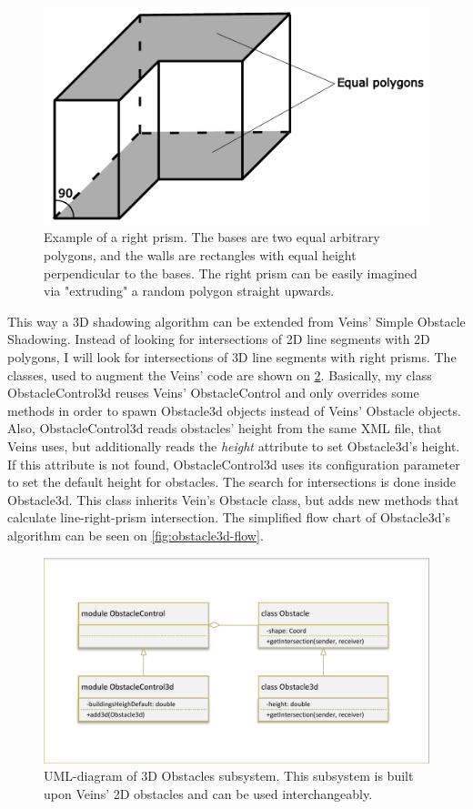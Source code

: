 \documentclass[]{nsm-thesis}
\begin{document}
\begin{figure}
	\centering
	\includegraphics[width=1\textwidth]{figures/RightPrism.pdf}
	\caption{Example of a right prism. The bases are two equal arbitrary polygons, and the walls are rectangles with equal height perpendicular to the bases. The right prism can be easily imagined via "extruding" a random polygon straight upwards.}
	\label{fig:rightprism}
\end{figure}

This way a 3D shadowing algorithm can be extended from Veins' Simple Obstacle Shadowing. Instead of looking for intersections of 2D line segments with 2D polygons, I will look for intersections of 3D line segments with right prisms. The classes, used to augment the Veins' code are shown on \cref{fig:obstacle3d-classes}.  Basically, my class ObstacleControl3d reuses Veins' ObstacleControl and only overrides some methods in order to spawn Obstacle3d objects instead of Veins' Obstacle objects. Also, ObstacleControl3d reads obstacles' height from the same XML file, that Veins uses, but additionally reads the \emph{height} attribute to set Obstacle3d's height. If this attribute is not found, ObstacleControl3d uses its configuration parameter to set the default height for obstacles. The search for intersections is done inside Obstacle3d. This class inherits Vein's Obstacle class, but adds new methods that calculate line-right-prism intersection. The simplified flow chart of Obstacle3d's algorithm can be seen on \cref{fig:obstacle3d-flow}. 

\begin{figure}
	\centering
	\includegraphics[width=1\textwidth]{figures/Obstacle3d-classes.pdf}
	\caption{UML-diagram of 3D Obstacles subsystem. This subsystem is built upon Veins' 2D obstacles and can be used interchangeably.}
	\label{fig:obstacle3d-classes}
\end{figure}
\end{document}
